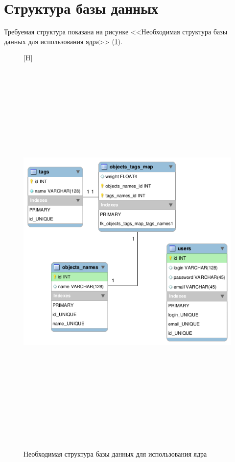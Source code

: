 \section{Структура базы данных}
Требуемая структура показана на рисунке <<Необходимая структура базы данных для
использования ядра>> (\ref{pic:bd-struct}).
\begin{figure}
\caption{Необходимая структура базы данных для использования ядра}
\label{pic:bd-struct}
	\begin{center}[H]
  \includegraphics[width=7in,height=8in]{pics/db-scheme-core.png}
\end{center}
\end{figure}

